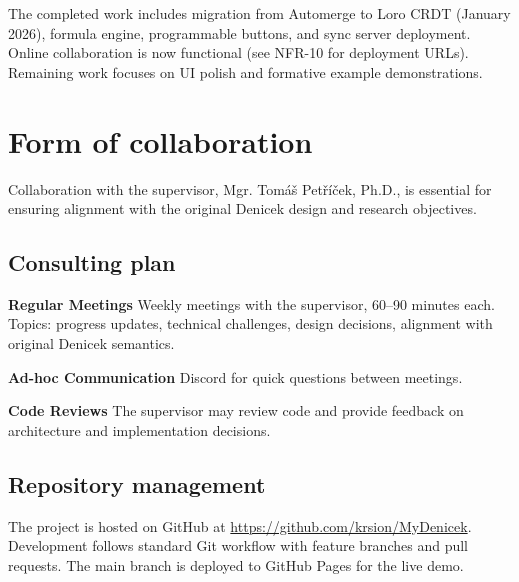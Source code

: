\documentclass{article}
\begin{document}
The completed work includes migration from Automerge to Loro CRDT (January 2026), formula engine, programmable buttons, and sync server deployment. Online collaboration is now functional (see NFR-10 for deployment URLs). Remaining work focuses on UI polish and formative example demonstrations.


\section{Form of collaboration}

Collaboration with the supervisor, Mgr. Tomáš Petříček, Ph.D., is essential for ensuring alignment with the original Denicek design and research objectives.

\subsection{Consulting plan}

\textbf{Regular Meetings} Weekly meetings with the supervisor, 60--90 minutes each. Topics: progress updates, technical challenges, design decisions, alignment with original Denicek semantics.

\textbf{Ad-hoc Communication} Discord for quick questions between meetings.

\textbf{Code Reviews} The supervisor may review code and provide feedback on architecture and implementation decisions.

\subsection{Repository management}

The project is hosted on GitHub at \url{https://github.com/krsion/MyDenicek}. Development follows standard Git workflow with feature branches and pull requests. The main branch is deployed to GitHub Pages for the live demo.
\end{document}
